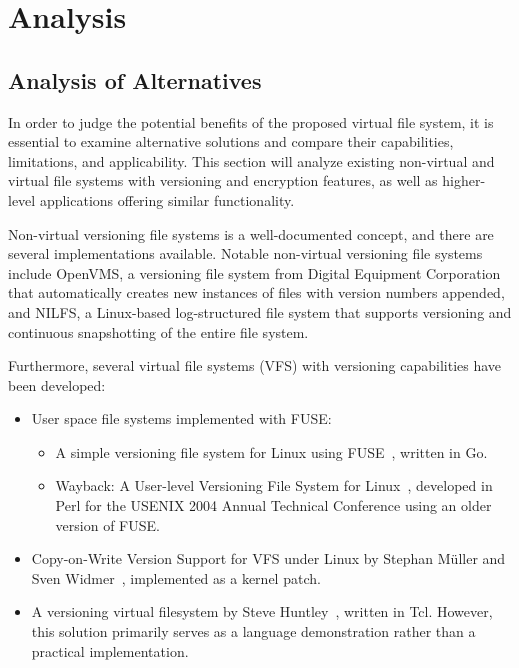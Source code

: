\chapter{Analysis}
\label{chap:analysis}

\section{Analysis of Alternatives}\label{sec:alternatives}

In order to judge the potential benefits of the proposed virtual file system, it is essential to examine alternative solutions and compare their capabilities, limitations, and applicability.
This section will analyze existing non-virtual and virtual file systems with versioning and encryption features, as well as higher-level applications offering similar functionality.

Non-virtual versioning file systems is a well-documented concept, and there are several implementations available.
Notable non-virtual versioning file systems include OpenVMS, a versioning file system from Digital Equipment Corporation that automatically creates new instances of files with version numbers appended, and NILFS, a Linux-based log-structured file system that supports versioning and continuous snapshotting of the entire file system.

Furthermore, several virtual file systems (VFS) with versioning capabilities have been developed:

\begin{itemize}
    \item User space file systems implemented with FUSE:
    \begin{itemize}
        \item A simple versioning file system for Linux using FUSE~\cite{simple_vfs}, written in Go.
        \item Wayback: A User-level Versioning File System for Linux~\cite{wayback_vfs}, developed in Perl for the USENIX 2004 Annual Technical Conference using an older version of FUSE.
    \end{itemize}
    \item Copy-on-Write Version Support for VFS under Linux by Stephan Müller and Sven Widmer~\cite{vvfs}, implemented as a kernel patch.
    \item A versioning virtual filesystem by Steve Huntley~\cite{huntley_vvfs}, written in Tcl.
    However, this solution primarily serves as a language demonstration rather than a practical implementation.
\end{itemize}

